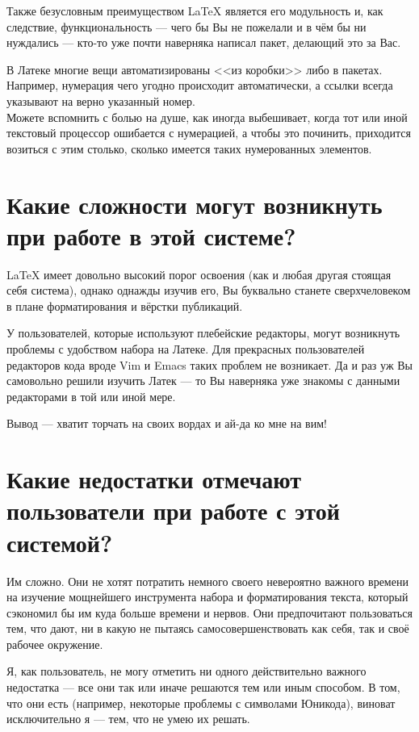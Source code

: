 \documentclass[a4paper,12pt]{article} %
\begin{document}
Также безусловным преимуществом \LaTeX{} является его модульность и, как следствие, функциональность --- чего бы Вы не пожелали и в чём бы ни нуждались --- кто-то уже почти наверняка написал пакет, делающий это за Вас.

В Латеке многие вещи автоматизированы <<из коробки>> либо в пакетах.
Например, нумерация чего угодно происходит автоматически, а ссылки всегда указывают на верно указанный номер.\\
Можете вспомнить с болью на душе, как иногда выбешивает, когда тот или иной текстовый процессор ошибается с нумерацией, а чтобы это починить, приходится возиться с этим столько, сколько имеется таких нумерованных элементов.


\section{Какие сложности могут возникнуть при работе в этой системе?}

\LaTeX{} имеет довольно высокий порог освоения (как и любая другая стоящая себя система), однако однажды изучив его, Вы буквально станете сверхчеловеком в плане форматирования и вёрстки публикаций.

У пользователей, которые используют плебейские редакторы, могут возникнуть проблемы с удобством набора на Латеке.
Для прекрасных пользователей редакторов кода вроде Vim и Emacs таких проблем не возникает.
Да и раз уж Вы самовольно решили изучить Латек --- то Вы наверняка уже знакомы с данными редакторами в той или иной мере.

Вывод --- хватит торчать на своих вордах и ай-да ко мне на вим!

\section{Какие недостатки отмечают пользователи при работе с этой системой?}

Им сложно.
Они не хотят потратить немного своего невероятно важного времени на изучение мощнейшего инструмента набора и форматирования текста, который сэкономил бы им куда больше времени и нервов.
Они предпочитают пользоваться тем, что дают, ни в какую не пытаясь самосовершенствовать как себя, так и своё рабочее окружение.

Я, как пользователь, не могу отметить ни одного действительно важного недостатка --- все они так или иначе решаются тем или иным способом.
В том, что они есть (например, некоторые проблемы с символами Юникода), виноват исключительно я --- тем, что не умею их решать.
\end{document}
